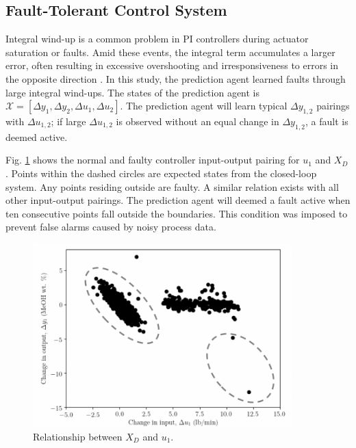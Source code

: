 \subsection{Fault-Tolerant Control System}
Integral wind-up is a common problem in PI controllers during actuator saturation or faults.  Amid these events, the integral term accumulates a larger error, often resulting in excessive overshooting and irresponsiveness to errors in the opposite direction \cite{process_control_ref13}. In this study, the prediction agent learned faults through large integral wind-ups.  The states of the prediction agent is ${\mathcal{X}} = [\Delta y_1, \Delta y_2, \Delta u_1, \Delta u_2]$. The prediction agent will learn typical $\Delta y_{1, 2}$ pairings with $\Delta u_{1, 2}$; if large $\Delta u_{1, 2}$ is observed without an equal change in $\Delta y_{1, 2}$, a fault is deemed active.

Fig. \ref{fig:FDS} shows the normal and faulty controller input-output pairing for $u_1$ and $X_D$. Points within the dashed circles are expected states from the closed-loop system. Any points residing outside are faulty. A similar relation exists with all other input-output pairings. The prediction agent will deemed a fault active when ten consecutive points fall outside the boundaries. This condition was imposed to prevent false alarms caused by noisy process data.
\begin{figure}[H]
    \begin{center}
        \includegraphics[width=10cm]{images/ftc/Boundaries.png}
        \caption{\label{fig:FDS} Relationship between $X_D$ and $u_1$.}
    \end{center}
\end{figure}

